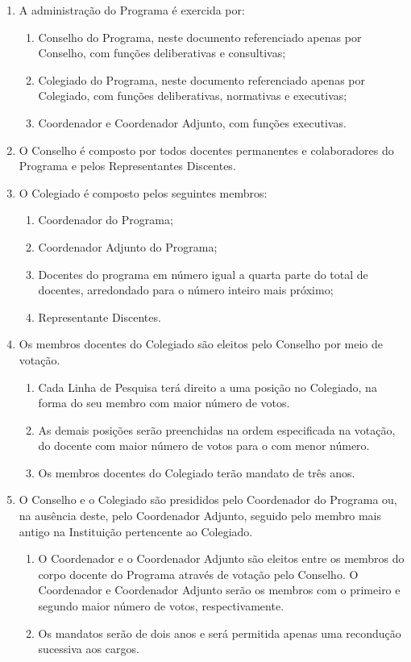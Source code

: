 \documentclass{article}
\newcommand{\grupoMenor}{Colegiado\xspace}
\newcommand{\grupoMaior}{Conselho\xspace}
\begin{document}
\begin{enumerate}

	\item A administração do Programa é exercida por:
	\begin{enumerate}[label=\Roman*]	
		\item \grupoMaior do Programa, neste documento referenciado apenas por \grupoMaior, com funções deliberativas e consultivas;
		\item \grupoMenor do Programa, neste documento referenciado apenas por \grupoMenor, com funções deliberativas, normativas e executivas;
		\item Coordenador e Coordenador Adjunto, com funções executivas.
	\end{enumerate}

	\item O \grupoMaior é composto por todos docentes permanentes e colaboradores do Programa e pelos Representantes Discentes.

	\item O \grupoMenor é composto pelos seguintes membros:
	\begin{enumerate}[label=\Roman*]
		\item Coordenador do Programa;
		\item Coordenador Adjunto do Programa;
		\item Docentes do programa em número igual a quarta parte do total de docentes, arredondado para o número inteiro mais próximo;
		\item Representante Discentes.
	\end{enumerate}

	\item Os membros docentes do \grupoMenor são eleitos pelo \grupoMaior por meio de votação.
	\begin{enumerate}
		\item Cada Linha de Pesquisa terá direito a uma posição no \grupoMenor, na forma do seu membro com maior número de votos.
		\item As demais posições serão preenchidas na ordem especificada na votação, do docente com maior número de votos para o com menor número.
		\item Os membros docentes do \grupoMenor terão mandato de três anos.
	\end{enumerate}

	\item O \grupoMaior e o \grupoMenor são presididos pelo Coordenador do Programa ou, na ausência deste, pelo Coordenador Adjunto, seguido pelo membro mais antigo na Instituição pertencente ao \grupoMenor.
	\begin{enumerate}
		\item O Coordenador e o Coordenador Adjunto são eleitos entre os membros do corpo docente do Programa através de votação pelo \grupoMaior. O Coordenador e Coordenador Adjunto serão os membros com o primeiro e segundo maior número de votos, respectivamente.
		\item Os mandatos serão de dois anos e será permitida apenas uma recondução sucessiva aos cargos.
	\end{enumerate}


\end{enumerate}
\end{document}
